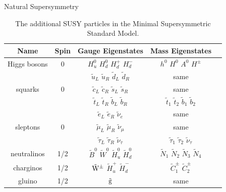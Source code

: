 \begin{section}{Natural Supersymmetry}
\begin{table}[tb!]
\centering
\renewcommand{\arraystretch}{1.25}
\begin{tabular}{|c|c|c|c|c|}
\hline
Name                       &  Spin                &  Gauge Eigenstates                                            &  Mass Eigenstates \\
\hline
\hline  
Higgs bosons               &  0                   &  $H^0_u$ $H^0_d$ $H^+_d$ $H^-_d$                              &  $h^0$ $H^0$ $A^0$ $H^\pm$ \\
\hline
\multirow{3}{*}{squarks}   &  \multirow{3}{*}{0}  &  $\tilde{u}_L$ $\tilde{u}_R$ $\tilde{d}_L$ $\tilde{d}_R$      &  same \\
                           &                      &  $\tilde{c}_L$ $\tilde{c}_R$ $\tilde{s}_L$ $\tilde{s}_R$      &  same \\
                           &                      &  $\tilde{t}_L$ $\tilde{t}_R$ $\tilde{b}_L$ $\tilde{b}_R$      &  $\tilde{t}_1$ $\tilde{t}_2$ $\tilde{b}_1$ $\tilde{b}_2$\\
\hline
\multirow{3}{*}{sleptons}  &  \multirow{3}{*}{0}  &  $\tilde{e}_L$ $\tilde{e}_R$ $\tilde{\nu}_e$                  &  same \\
                           &                      &  $\tilde{\mu}_L$ $\tilde{\mu}_R$ $\tilde{\nu}_\mu$            &  same \\
                           &                      &  $\tilde{\tau}_L$ $\tilde{\tau}_R$ $\tilde{\nu}_\tau$         &  $\tilde{\tau}_1$ $\tilde{\tau}_2$ $\tilde{\nu}_\tau$\\
\hline
neutralinos                &  1/2                 &  $\tilde{B}^0$ $\tilde{W}^0$ $\tilde{H}^0_u$ $\tilde{H}^0_d$  &  $\tilde{N}_1$ $\tilde{N}_2$ $\tilde{N}_3$ $\tilde{N}_4$\\
\hline
charginos                  &  1/2                 & $\tilde{\mathrm{W}}^\pm$ $\tilde{H}^+_u$ $\tilde{H}^-_d$         &  $\tilde{C}^\pm_1$ $\tilde{C}^\pm_2$ \\
\hline
gluino                     &  1/2                 & $\tilde{\mathrm{g}}$                                                        &  same \\
\hline
\end{tabular}
\renewcommand{\arraystretch}{1}
\caption{The additional SUSY particles in the Minimal Supersymmetric Standard Model.}
\label{tab:susy_particles}
\end{table}


\end{section}
